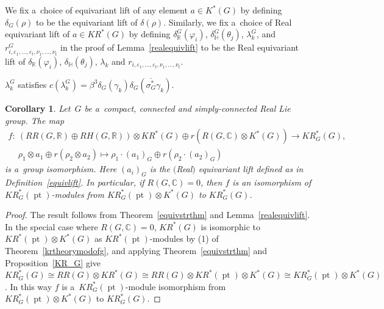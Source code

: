\documentclass[11pt]{article}
\numberwithin{equation}{section}
\newtheorem{Corollary}[Theorem]{Corollary}
\DeclareMathOperator{\pt}{pt}
\begin{document}
\begin{Definition}
\label{equivlift}
We f\/ix a~choice of equivariant lift of any element $a\in K^*(G)$ by def\/ining $\delta_G(\rho)$ to be the equivariant lift
of $\delta(\rho)$.
Similarly, we f\/ix a~choice of Real equivariant lift of $a\in KR^*(G)$ by def\/ining $\delta_\mathbb{R}^G(\varphi_i)$,
$\delta_\mathbb{H}^G(\theta_j)$, $\lambda_k^G$, and $r^G_{i, \varepsilon_1, \dots, \varepsilon_t, \nu_1, \dots, \nu_t}$
in the proof of Lemma~\ref{realequivlift} to be the Real equivariant lift of $\delta_\mathbb{R}(\varphi_i)$,
$\delta_\mathbb{H}(\theta_j)$, $\lambda_k$ and $r_{i, \varepsilon_1, \dots, \varepsilon_t, \nu_1, \dots, \nu_t}$.
\end{Definition}
\begin{Remark}
\label{cplxeqsquare}
$\lambda^G_k$ satisf\/ies $c(\lambda^G_k)=\beta^3\delta_G(\gamma_k)\delta_G(\overline{\sigma_G^*}
\gamma_k)$.
\end{Remark}
\begin{Corollary}
\label{equivstrthmg}
Let~$G$ be a~compact, connected and simply-connected Real Lie group.
The map
\begin{gather*}
f: \ (RR(G, \mathbb{R})\oplus RH(G, \mathbb{R}))\otimes KR^*(G)\oplus r(R(G, \mathbb{C})\otimes K^*(G))  \to  KR_G^*(G),
\\
\phantom{f: {}} \
\rho_1\otimes a_1\oplus r(\rho_2\otimes a_2)  \mapsto  \rho_1\cdot (a_1)_{G}\oplus r(\rho_2\cdot (a_2)_G)
\end{gather*}
is a~group isomorphism.
Here $(a_i)_G$ is the $($Real$)$ equivariant lift defined as in Definition~{\rm \ref{equivlift}}.
In particular, if $R(G, \mathbb{C})=0$, then $f$ is an isomorphism of $KR^*_{G}(\pt)$-modules from
$KR_G^*(\pt)\otimes K^*(G)$ to $KR_G^*(G)$.
\end{Corollary}
\begin{proof}
The result follows from Theorem~\ref{equivstrthm} and Lemma~\ref{realequivlift}.
In the special case where $R(G, \mathbb{C})=0$, $KR^*(G)$ is isomorphic to $KR^*(\pt)\otimes K^*(G)$ as
$KR^*(\pt)$-modules by (1) of Theorem~\ref{krtheorymodofg}, and applying Theorem~\ref{equivstrthm} and
Proposition~\ref{KR_G} give $KR^*_G(G)\cong RR(G)\otimes KR^*(G)\cong RR(G)\otimes KR^*(\pt)\otimes K^*(G)\cong
KR^*_G(\pt)\otimes K^*(G)$.
In this way $f$ is a~$KR_G^*(\pt)$-module isomorphism from $KR_G^*(\pt)\otimes K^*(G)$ to $KR_G^*(G)$.
\end{proof}
\end{document}
